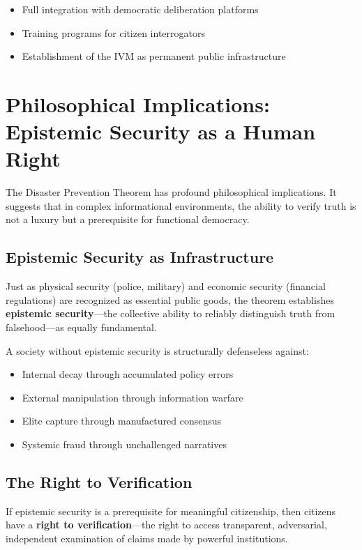 \documentclass[11pt,a4paper]{article}
\begin{document}
\begin{small}
\begin{itemize}
    \item Full integration with democratic deliberation platforms \citep{Kovnatsky2025SVE5}
    \item Training programs for citizen interrogators
    \item Establishment of the IVM as permanent public infrastructure
\end{itemize}

\section{Philosophical Implications: Epistemic Security as a Human Right}

The Disaster Prevention Theorem has profound philosophical implications. It suggests that in complex informational environments, the ability to verify truth is not a luxury but a prerequisite for functional democracy.

\subsection{Epistemic Security as Infrastructure}

Just as physical security (police, military) and economic security (financial regulations) are recognized as essential public goods, the theorem establishes \textbf{epistemic security}---the collective ability to reliably distinguish truth from falsehood---as equally fundamental.

A society without epistemic security is structurally defenseless against:
\begin{itemize}
    \item Internal decay through accumulated policy errors
    \item External manipulation through information warfare
    \item Elite capture through manufactured consensus
    \item Systemic fraud through unchallenged narratives
\end{itemize}

\subsection{The Right to Verification}

If epistemic security is a prerequisite for meaningful citizenship, then citizens have a \textbf{right to verification}---the right to access transparent, adversarial, independent examination of claims made by powerful institutions.


\end{small}
\end{document}
